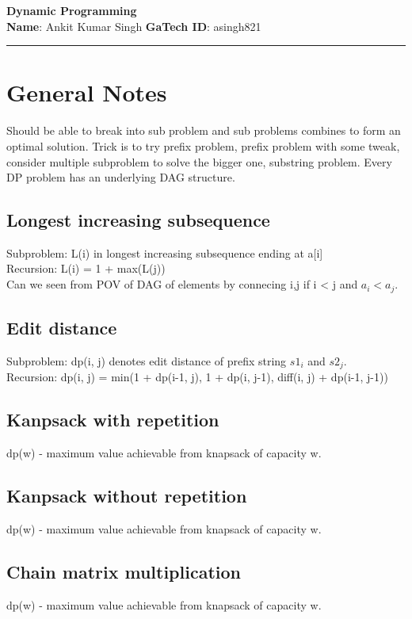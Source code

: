 \documentclass[11pt,letterpaper]{article}
\begin{document}
\pagestyle{plain}
 
\begin{center}
\textbf{\large Dynamic Programming}\\
\textbf{Name}: Ankit Kumar Singh
\hspace{8cm}
\textbf{GaTech ID}: asingh821
\end{center}
\hrule

\section{General Notes}
Should be able to break into sub problem and sub problems combines to form an optimal solution. Trick is to try prefix problem, prefix problem with some tweak, consider multiple subproblem to solve the bigger one, substring problem. Every DP problem has an underlying DAG structure.

\subsection{Longest increasing subsequence}
Subproblem: L(i) in longest increasing subsequence ending at a[i]
\\ Recursion: L(i) = 1 + max(L(j))
\\ Can we seen from POV of DAG of elements by connecing i,j if i < j and $a_{i} < a_{j}$.

\subsection{Edit distance}
Subproblem: dp(i, j) denotes edit distance of prefix string $s1_{i}$ and $s2_{j}$. 
\\ Recursion: dp(i, j) = min(1 + dp(i-1, j), 1 + dp(i, j-1), diff(i, j) + dp(i-1, j-1))

\subsection{Kanpsack with repetition}
dp(w) - maximum value achievable from knapsack of capacity w. 

\subsection{Kanpsack without repetition}
dp(w) - maximum value achievable from knapsack of capacity w. 

\subsection{Chain matrix multiplication}
dp(w) - maximum value achievable from knapsack of capacity w. 
\end{document}
